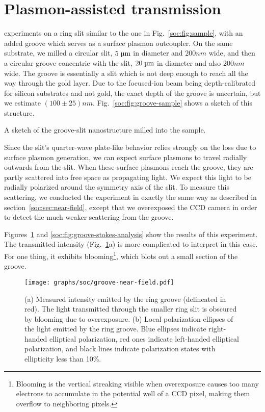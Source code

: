 \section{Plasmon-assisted transmission}

 experiments on a ring slit similar to the one in Fig.~\ref{soc:fig:sample}, with an added groove which serves as a surface plasmon outcoupler.
On the same substrate, we milled a circular slit, $5\micron$ in diameter and $200\unit{nm}$ wide, and then a circular groove concentric with the slit, $20\micron$ in diameter and also $200\unit{nm}$ wide.
The groove is essentially a slit which is not deep enough to reach all the way through the gold layer.
Due to the focused-ion beam being depth-calibrated for silicon substrates and not gold, the exact depth of the groove is uncertain, but we estimate $(100\pm25)\unit{nm}$.
Fig.~\ref{soc:fig:groove-sample} shows a sketch of this structure.

\begin{marginfigure}
  \caption{A sketch of the groove-slit nanostructure milled into the sample.}
  \label{soc:fig:groove-sample}
\end{marginfigure}
Since the slit's quarter-wave plate-like behavior relies strongly on the loss due to surface plasmon generation, we can expect surface plasmons to travel radially outwards from the slit.
When these surface plasmons reach the groove, they are partly scattered into free space as propagating light.
We expect this light to be radially polarized around the symmetry axis of the slit.
To measure this scattering, we conducted the experiment in exactly the same way as described in section~\ref{soc:sec:near-field}, except that we overexposed the \gls{CCD} camera in order to detect the much weaker scattering from the groove.

Figures~\ref{soc:fig:groove-near-field} and \ref{soc:fig:groove-stokes-analysis} show the results of this experiment.
The transmitted intensity (Fig.~\ref{soc:fig:groove-near-field}a) is more complicated to interpret in this case.
For one thing, it exhibits blooming\footnote{Blooming is the vertical streaking visible when overexposure causes too many electrons to accumulate in the potential well of a \gls{CCD} pixel, making them overflow to neighboring pixels.}, which blots out a small section of the groove.
%
\begin{figure}[tb]
  \centering\texttt{[image: graphs/soc/groove-near-field.pdf]}
  \caption{(a) Measured intensity emitted by the ring groove (delineated in red).
  The light transmitted through the smaller ring slit is obscured by blooming due to overexposure.
  (b) Local polarization ellipses of the light emitted by the ring groove.
  Blue ellipses indicate right-handed elliptical polarization, red ones indicate left-handed elliptical polarization, and black lines indicate polarization states with ellipticity less than 10\%.}
  \label{soc:fig:groove-near-field}
\end{figure}

